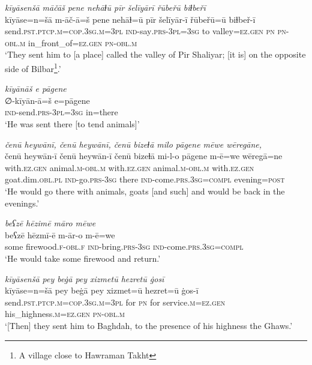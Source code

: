 \ea \label{ZP.10}
\textit{kīyāsenšā māčāš pene nehāɫū pīr šelīyārī řūbeřū biɫbeřī} \\ 
\gll kīyāse=n=šā m-āč-ā=š pene nehāɫ=ū pīr šelīyār-ī řūbeřū=ū biɫbeř-ī \\ 
 send\textsc{.pst}\textsc{.ptcp}\textsc{.m}\textsc{=cop}\textsc{.3sg}\textsc{.m}\textsc{=3pl} \textsc{ind-}say\textsc{.prs}\textsc{-3pl}\textsc{=3sg} to valley\textsc{\textsc{=ez.gen}} \textsc{pn} \textsc{pn}\textsc{-obl}\textsc{.m} in\_front\_of\textsc{\textsc{=ez.gen}} \textsc{pn}\textsc{-obl}\textsc{.m} \\ 
\glt `They sent him to [a place] called the valley of Pir Shaliyar; [it is] on the opposite side of Bilbar\footnote{A village close to Hawraman Takht}.'
\z 
 
\ea \label{ZP.11}
\textit{kīyānāš e pāgene} \\ 
\gll ∅-kīyān-ā=š e=pāgene \\ 
 \textsc{ind-}send\textsc{.prs}\textsc{-3pl}\textsc{=3sg} in=there \\ 
\glt `He was sent there [to tend animals]'
\z 
 
\ea \label{ZP.12}
\textit{čenū heywānī, čenū heywānī, čenū bizeɫā milo pāgene mēwe wēregāne,} \\ 
\gll čenū heywān-ī čenū heywān-ī čenū bizeɫā mi-l-o pāgene m-ē=we wēregā=ne \\ 
 with\textsc{.ez.gen} animal\textsc{.m}\textsc{-obl}\textsc{.m} with\textsc{.ez.gen} animal\textsc{.m}\textsc{-obl}\textsc{.m} with\textsc{.ez.gen} goat.dim\textsc{.obl}\textsc{.pl} \textsc{ind-}go\textsc{.prs}\textsc{-3sg} there \textsc{ind-}come\textsc{.prs}\textsc{.3sg}\textsc{=compl} evening\textsc{=\textsc{post}} \\ 
\glt `He would go there with animals, goats [and such] and would be back in the evenings.'
\z 
 
\ea \label{ZP.13}
\textit{beʕzē hēzimē māro mēwe} \\ 
\gll beʕzē hēzmī-ē m-ār-o m-ē=we \\ 
 some firewood\textsc{.f}\textsc{-obl}\textsc{.f} \textsc{ind-}bring\textsc{.prs}\textsc{-3sg} \textsc{ind-}come\textsc{.prs}\textsc{.3sg}\textsc{=compl} \\ 
\glt `He would take some firewood and return.'
\z 
 
\ea \label{ZP.14}
\textit{kīyāsenšā pey beġā pey xizmetū hezretū ġosī} \\ 
\gll kīyāse=n=šā pey beġā pey xizmet=ū hezret=ū ġos-ī \\ 
 send\textsc{.pst}\textsc{.ptcp}\textsc{.m}\textsc{=cop}\textsc{.3sg}\textsc{.m}\textsc{=3pl} for \textsc{pn} for service\textsc{.m}\textsc{\textsc{=ez.gen}} his\_highness\textsc{.m}\textsc{\textsc{=ez.gen}} \textsc{pn}\textsc{-obl}\textsc{.m} \\ 
\glt `[Then] they sent him to Baghdah, to the presence of his highness the Ghaws.'
\z 
 
